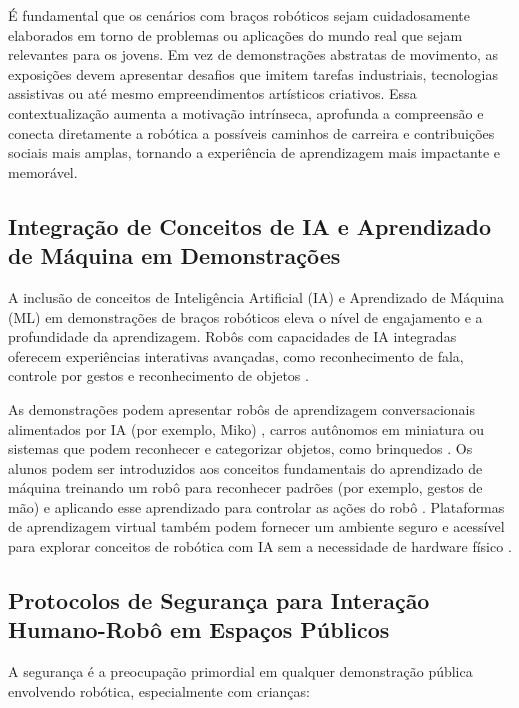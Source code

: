 \documentclass[%
  a4paper,%
  12pt,%
  fleqn,%
  english,%
  brazilian,%
]{article}
\begin{document}
É fundamental que os cenários com braços robóticos sejam cuidadosamente elaborados em torno de problemas ou aplicações do mundo real que sejam relevantes para os jovens. Em vez de demonstrações abstratas de movimento, as exposições devem apresentar desafios que imitem tarefas industriais, tecnologias assistivas ou até mesmo empreendimentos artísticos criativos. Essa contextualização aumenta a motivação intrínseca, aprofunda a compreensão e conecta diretamente a robótica a possíveis caminhos de carreira e contribuições sociais mais amplas, tornando a experiência de aprendizagem mais impactante e memorável.

\subsection{Integração de Conceitos de IA e Aprendizado de Máquina em Demonstrações}
A inclusão de conceitos de Inteligência Artificial (IA) e Aprendizado de Máquina (ML) em demonstrações de braços robóticos eleva o nível de engajamento e a profundidade da aprendizagem. Robôs com capacidades de IA integradas oferecem experiências interativas avançadas, como reconhecimento de fala, controle por gestos e reconhecimento de objetos \cite{vexRoboticsHome2025}.

As demonstrações podem apresentar robôs de aprendizagem conversacionais alimentados por IA (por exemplo, Miko) \cite{mikoAIPoweredRobot2025}, carros autônomos em miniatura \cite{stempediaProjects2025} ou sistemas que podem reconhecer e categorizar objetos, como brinquedos \cite{stempediaProjects2025}. Os alunos podem ser introduzidos aos conceitos fundamentais do aprendizado de máquina treinando um robô para reconhecer padrões (por exemplo, gestos de mão) e aplicando esse aprendizado para controlar as ações do robô \cite{stempediaProjects2025}. Plataformas de aprendizagem virtual também podem fornecer um ambiente seguro e acessível para explorar conceitos de robótica com IA sem a necessidade de hardware físico \cite{coderoboPickPlace2025}.

\subsection{Protocolos de Segurança para Interação Humano-Robô em Espaços Públicos}
A segurança é a preocupação primordial em qualquer demonstração pública envolvendo robótica, especialmente com crianças:
\end{document}
